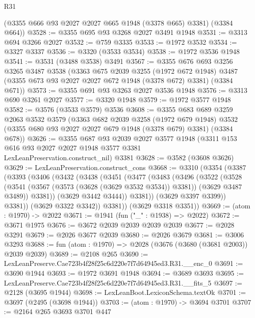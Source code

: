\begin{lexlean}{R31}
\begin{coremodule}
      (@3355 @666 @93 @2027 @2027 @665 @1948 (@3378 @665) @3381)
      (@3384 @664))
@3528 := @3355 @695 @93 @3268 @2027 @3491 @1948
@3531 := @3313 @694 @3266 @2027
@3532 := @759 @3335
@3533 := @1972 @3532
@3534 := @3327 @3337
@3536 := @3320 (@3533 @3534)
@3538 := @1972 @3536 @1948
@3541 := @3531 (@3488 @3538) @3491
@3567 := @3355
    @676
    @693
    @3256
    @3265
    @3487
    @3538
    (@3363
      @675
      @2039
      @3255
      (@1972 @672 @1948)
      @3487
      (@3355 @673 @93 @2027 @2027 @672 @1948 (@3378 @672) @3381)
      (@3384 @671))
@3573 := @3355 @691 @93 @3263 @2027 @3536 @1948
@3576 := @3313 @690 @3261 @2027
@3577 := @3320 @1948
@3579 := @1972 @3577 @1948
@3582 := @3576 (@3533 @3579) @3536
@3608 := @3355
    @683
    @689
    @3259
    @2063
    @3532
    @3579
    (@3363
      @682
      @2039
      @3258
      (@1972 @679 @1948)
      @3532
      (@3355 @680 @93 @2027 @2027 @679 @1948 (@3378 @679) @3381)
      (@3384 @678))
@3626 := @3355
    @687
    @93
    @2039
    @2027
    @3577
    @1948
    (@3311 @153 @616 @93 @2027 @2027 @1948 @3577 @3381 LexLeanPreservation.construct_nil)
    @3381
@3628 := @3582 (@3608 @3626)
@3629 := LexLeanPreservation.construct_cons
@3668 := @3310
    (@3354
      (@3387
        (@3393
          (@3406
            (@3432
              (@3438
                (@3451
                  (@3477
                    (@3483
                      (@3496
                        (@3522
                          (@3528
                            (@3541
                              (@3567 (@3573 (@3628 (@3629 @3532 @3534)) @3381))
                              (@3629 @3487 @3489))
                            @3381))
                        (@3629 @3442 @3444))
                      @3381))
                  (@3629 @3397 @3399))
                @3381))
            (@3629 @3322 @3342))
          @3381))
      (@3629 @3318 @3351))
@3669 := (atom : @1970) -> @2022
@3671 := @1941 (fun ("_" : @1938) => @2022)
@3672 := @3671 @1975
@3676 := @3672 @2039 @2039 @2039 @2039
@3677 := @2028 @3291
@3679 := @2026 @3677 @2039
@3680 := @2026 @3679
@3681 := @3006 @3293
@3688 := fun (atom : @1970) => @2028 (@3676 (@3680 (@3681 @2003)) @2039 @2039)
@3689 := @2108 @265
@3690 := LexLeanPreserve.Cae723b4f28f25c6d220e7f7d64945ed3.R31.__enc_0
@3691 := @3690 @1944
@3693 := @1972 @3691 @1948
@3694 := @3689 @3693
@3695 := LexLeanPreserve.Cae723b4f28f25c6d220e7f7d64945ed3.R31.__fits_5
@3697 := @2128 (@3695 @1944)
@3698 := LexLeanBoot.LexiconSchema.textOk
@3701 := @3697 (@2495 (@3698 @1944))
@3703 := (atom : @1970) -> @3694 @3701
@3707 := @2164 @265 @3693 @3701 @447

\end{coremodule}
\end{lexlean}
